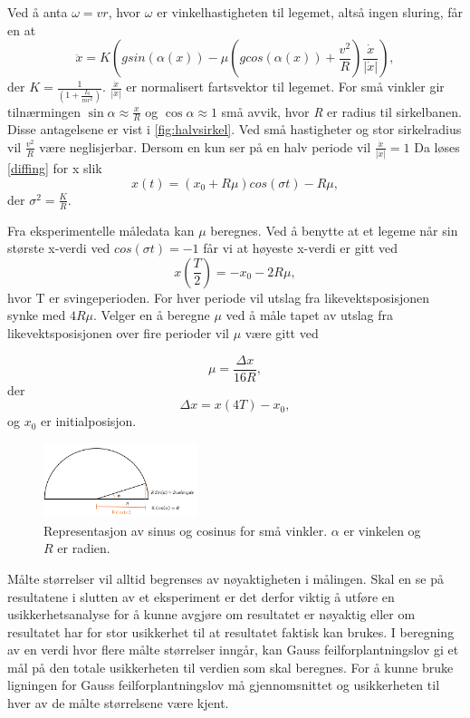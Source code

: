 Ved å anta $\omega=vr$, hvor $\omega$ er vinkelhastigheten til legemet, altså ingen sluring, får en at 
\begin{equation}
    \ddot{x} = K \left(g sin(\alpha (x)) - \mu \left(g cos(\alpha (x)) + \frac{v^2}{R}\right)  \frac{\dot{x}}{|\dot{x}|}\right),
    \label{diffing}
\end{equation}
der $K = \frac{1}{(1+\frac{I_{0}}{mr^2})}$. $\frac{\dot{x}}{|\dot{x}|}$ er normalisert fartsvektor til legemet. 
For små vinkler gir tilnærmingen $ \sin\alpha \approx \frac{x}{R} $ og $\cos\alpha \approx 1$  små avvik, hvor \textit{R} er radius til sirkelbanen. Disse antagelsene er vist i \autoref{fig:halvsirkel}. 
Ved små hastigheter og stor sirkelradius vil $\frac{v^2}{R}$ være neglisjerbar.
Dersom en kun ser på en halv periode vil $\frac{\dot{x}}{|\dot{x}|} = 1$ Da løses \eqref{diffing} for x slik
\begin{equation}
\label{eq:Posisjon av tid}
x(t) = (x_{0} + R\mu)cos(\sigma t)-R\mu,
\end{equation}
der $\sigma^2=\frac{K}{R}$. 

Fra eksperimentelle måledata kan $\mu$ beregnes. Ved å benytte at et legeme når sin største x-verdi ved $cos(\sigma t) = -1$ får vi at høyeste x-verdi er gitt ved
$$x\left( \frac{T}{2} \right) = -x_0 - 2R\mu,$$
hvor T er svingeperioden. For hver periode vil utslag fra likevektsposisjonen synke med $4R\mu$. 
Velger en å beregne $\mu$ ved å måle tapet av utslag fra likevektsposisjonen over fire perioder vil $\mu$ være gitt ved

\begin{equation}
\label{eq:Utrykk for my}
\mu = \frac{\Delta x}{16R},
\end{equation}
der $$\Delta x = x(4T) - x_{0},$$ og $x_{0}$ er initialposisjon.
\FloatBarrier
\begin{figure}[h!] 
\centering
\includegraphics[width=0.4\textwidth]{halvny.png}

\caption{Representasjon av sinus og cosinus for små vinkler. $\alpha$ er vinkelen og $R$ er radien.}
\label{fig:halvsirkel} %
\end{figure}
\FloatBarrier

Målte størrelser vil alltid begrenses av nøyaktigheten i målingen. Skal en se på resultatene i slutten av et eksperiment er det derfor viktig å utføre en usikkerhetsanalyse for å kunne avgjøre om resultatet er nøyaktig eller om resultatet har for stor usikkerhet til at resultatet faktisk kan brukes.
I beregning av en verdi hvor flere målte størrelser inngår, kan Gauss feilforplantningslov gi et mål på den totale usikkerheten til verdien som skal beregnes. For å kunne bruke ligningen for Gauss feilforplantningslov må gjennomsnittet og usikkerheten til hver av de målte størrelsene være kjent.

